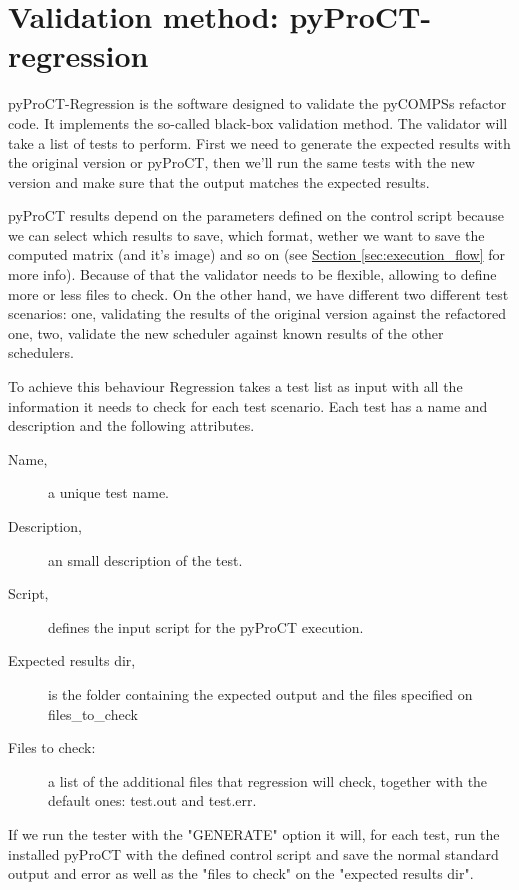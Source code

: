 \section{Validation method: pyProCT-regression}


pyProCT-Regression is the software designed to validate the pyCOMPSs refactor code. It implements the so-called black-box validation method. The validator will take a list of tests to perform. First we need to generate the expected results with the original version or pyProCT, then we'll run the same tests with the new version and make sure that the output matches the expected results.


pyProCT results depend on the parameters defined on the control script because we can select which results to save, which format, wether we want to save the computed matrix (and it's image) and so on (see \hyperref[sec:execution_flow]{Section \ref{sec:execution_flow}} for more info). Because of that the validator needs to be flexible, allowing to define more or less files to check. On the other hand, we have different two different test scenarios: one, validating the results of the original version against the refactored one, two, validate the new scheduler against known results of the other schedulers.

To achieve this behaviour Regression takes a test list as input with all the information it needs to check for each test scenario. 
Each test has a name and description and the following attributes.

\begin{description}
\item [Name,] a unique test name.
\item [Description,] an small description of the test.
\item [Script,] defines the input script for the pyProCT execution. 
\item [Expected results dir,] is the folder containing the expected output and the files specified on files\_to\_check
\item [Files to check:] a list of the additional files that regression will check, together with the default ones: test.out and test.err.
\end{description}

If we run the tester with the "GENERATE" option it will, for each test, run the installed pyProCT with the defined control script and save the normal standard output and error as well as the "files to check" on the "expected results dir".

